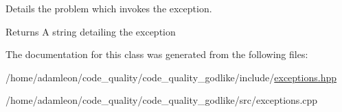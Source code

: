Details the problem which invokes the exception. 

\begin{DoxyReturn}{Returns}
A string detailing the exception 
\end{DoxyReturn}


The documentation for this class was generated from the following files\+:\begin{DoxyCompactItemize}
\item 
/home/adamleon/code\+\_\+quality/code\+\_\+quality\+\_\+godlike/include/\hyperlink{exceptions_8hpp}{exceptions.\+hpp}\item 
/home/adamleon/code\+\_\+quality/code\+\_\+quality\+\_\+godlike/src/exceptions.\+cpp\end{DoxyCompactItemize}
